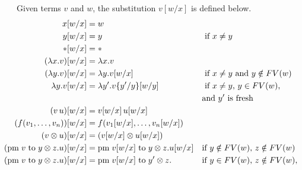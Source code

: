 \begin{definition}
Given terms $v$ and $w$, the substitution $ v[w/x]$ is defined below. 
\begin{align*}
   \hspace{-23pt}  x[w/x] &= w \\
   \hspace{-23pt}  y[w/x] &= y && \text{ if $x \neq y$} \\
  \hspace{-23pt}   *[w/x] &=   * \\
  \hspace{-23pt}  (\lambda x. v)[w/x] &=  \lambda x. v  \\
  \hspace{-23pt}  (\lambda y. v)[w/x] &=  \lambda y. v[w/x]  &&\text{ if $x \neq y$ and $y \notin FV(w)$}  \\
   \hspace{-23pt}  \lambda y. v[w/x] &=  \lambda y'. v\{y'/y\}[w/y] &&\text{ if $x \neq y$, $y \in FV(w)$,}  \\
   \hspace{-23pt}& && \text{and $y'$ is fresh}\\
   \hspace{-23pt} (v \, u) [w/x] &= v [w/x] \, u [w/x] \\
   \hspace{-23pt}  (f(v_1, \ldots, v_n))[w/x] & = f(v_1[w/x], \ldots, v_n[w/x]) \\
   \hspace{-23pt}  (v \otimes u)[w/x] & = (v[w/x] \otimes u[w/x]) \\
   \hspace{-23pt} (\text{pm} \hspace{3 pt} v \hspace{3 pt} \text{to} \hspace{3 pt} y \otimes z. u)[w/x] &= \text{pm} \hspace{3 pt} v[w/x] \hspace{3 pt} \text{to} \hspace{3 pt} y \otimes z. u [w/x]  &&   \text{if $y \notin FV(w)$, $z \notin FV(w)$} \\
   \hspace{-23pt} (\text{pm} \hspace{3 pt} v \hspace{3 pt} \text{to} \hspace{3 pt} y \otimes z. u)[w/x] &= \text{pm} \hspace{3 pt} v [w/x] \hspace{3 pt} \text{to} \hspace{3 pt} y' \otimes z.  &&  \text{if $y \in FV(w)$, $z \notin FV(w)$,  } \\

\end{align*}
\end{definition}
